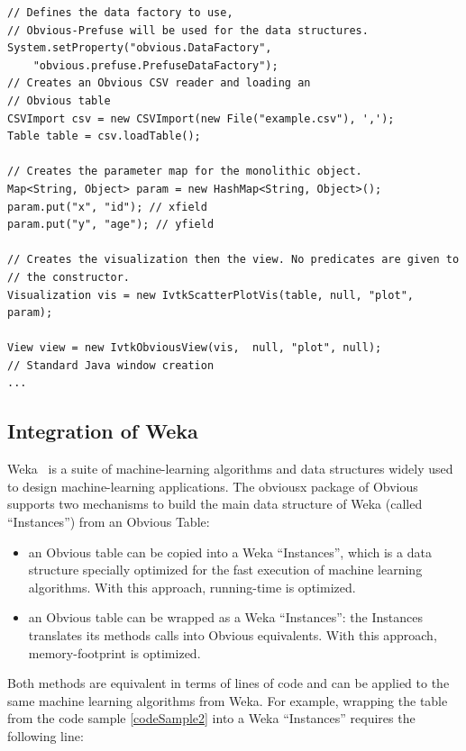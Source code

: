\begin{lstlisting}[caption={Combining different Obvious implementations to display a scatter-plot},label=codeSample2]
// Defines the data factory to use,
// Obvious-Prefuse will be used for the data structures.
System.setProperty("obvious.DataFactory",
    "obvious.prefuse.PrefuseDataFactory");
// Creates an Obvious CSV reader and loading an
// Obvious table
CSVImport csv = new CSVImport(new File("example.csv"), ',');
Table table = csv.loadTable();

// Creates the parameter map for the monolithic object.
Map<String, Object> param = new HashMap<String, Object>();
param.put("x", "id"); // xfield
param.put("y", "age"); // yfield

// Creates the visualization then the view. No predicates are given to
// the constructor.
Visualization vis = new IvtkScatterPlotVis(table, null, "plot", param);

View view = new IvtkObviousView(vis,  null, "plot", null);
// Standard Java window creation
...
\end{lstlisting}

\subsection{Integration of Weka}

Weka~\cite{Weka} is a suite of machine-learning algorithms and data
structures widely used to design machine-learning applications.  
The obviousx package of Obvious supports two mechanisms to build the
main data structure of Weka (called ``Instances'') from an Obvious
Table:

\begin{itemize}[noitemsep]
\item an Obvious table can be copied into a Weka ``Instances'', which
  is a data structure specially optimized for the fast execution of
   machine learning algorithms.  With this approach, running-time is
   optimized.
\item an Obvious table can be wrapped as a Weka ``Instances'': the
  Instances translates its methods calls into Obvious equivalents.
  With this approach, memory-footprint is optimized.
\end{itemize}

Both methods are equivalent in terms of lines of code and can be
applied to the same machine learning algorithms from Weka.  For
example, wrapping the table from the code sample \ref{codeSample2}
into a Weka ``Instances''  requires the following line:

